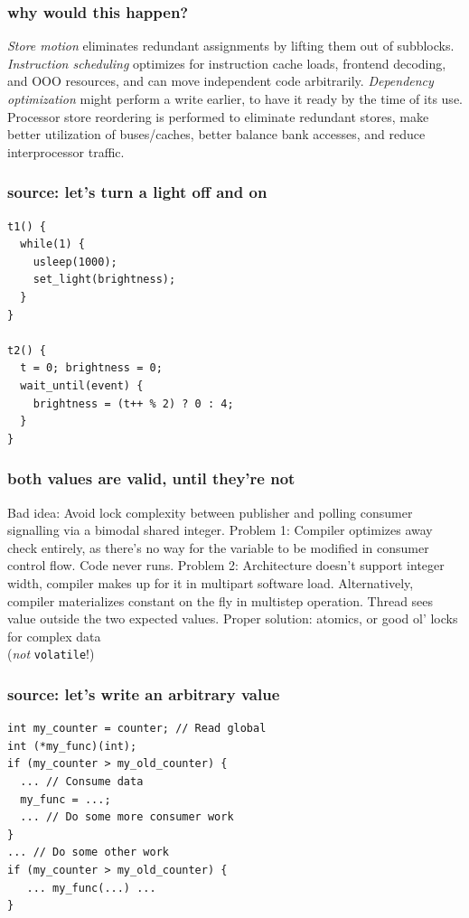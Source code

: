 \documentclass{beamer}
\begin{document}
\begin{frame}
\frametitle{why would this happen?}
\textit{Store motion} eliminates redundant assignments by lifting them
out of subblocks. \textit{Instruction scheduling} optimizes for instruction
cache loads, frontend decoding, and OOO resources, and can move independent
code arbitrarily. \textit{Dependency optimization} might perform a write
earlier, to have it ready by the time of its use.
\vfill
Processor store reordering is performed to eliminate redundant stores,
make better utilization of buses/caches, better balance bank accesses,
and reduce interprocessor traffic.
\end{frame}

\begin{frame}[fragile]
\frametitle{source: let's turn a light off and on}
\begin{lstlisting}
t1() {
  while(1) {
    usleep(1000);
    set_light(brightness);
  }
}

t2() {
  t = 0; brightness = 0;
  wait_until(event) {
    brightness = (t++ % 2) ? 0 : 4;
  }
}
\end{lstlisting}
\end{frame}

\begin{frame}
\frametitle{both values are valid, until they're not}
Bad idea: Avoid lock complexity between publisher and polling consumer signalling via a bimodal shared integer.
\vfill
Problem 1: Compiler optimizes away check entirely, as there's no way for the variable to be modified in consumer control flow. Code never runs.
\vfill
Problem 2: Architecture doesn't support integer width, compiler makes up for it in multipart software load. Alternatively, compiler materializes constant on the fly in multistep operation. Thread sees value outside the two expected values.
\vfill
Proper solution: atomics, or good ol' locks for complex data\\
  (\textit{not} \texttt{volatile}!)
\end{frame}

\begin{frame}[fragile]
\frametitle{source: let's write an arbitrary value}
\begin{lstlisting}
int my_counter = counter; // Read global
int (*my_func)(int);
if (my_counter > my_old_counter) {
  ... // Consume data
  my_func = ...;
  ... // Do some more consumer work
}
... // Do some other work
if (my_counter > my_old_counter) {
   ... my_func(...) ...
}
\end{lstlisting}
\end{frame}
\end{document}
